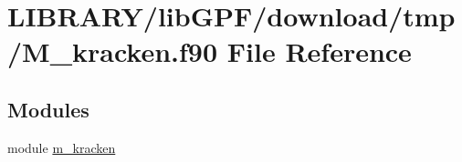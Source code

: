 \hypertarget{M__kracken_8f90}{}\section{L\+I\+B\+R\+A\+R\+Y/lib\+G\+P\+F/download/tmp/\+M\+\_\+kracken.f90 File Reference}
\label{M__kracken_8f90}
\subsection*{Modules}
\begin{DoxyCompactItemize}
\item 
module \hyperlink{namespacem__kracken}{m\+\_\+kracken}
\end{DoxyCompactItemize}
